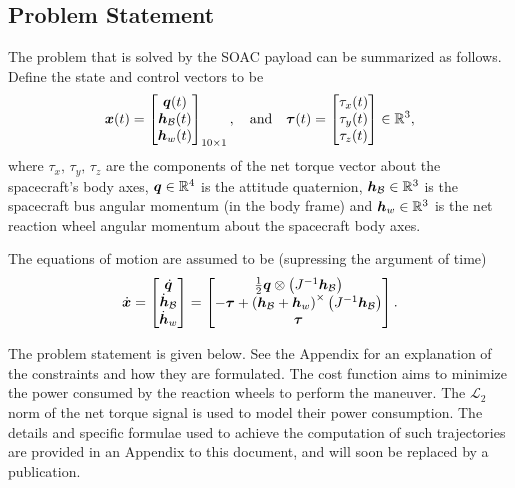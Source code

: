 \documentclass[10pt]{article}
\begin{document}
\subsection{Problem Statement}

The problem that is solved by the SOAC payload can be summarized as follows. Define the state and control vectors to be
\begin{equation}
\bm{x}(t) = \begin{bmatrix}
\bm{q}(t) \\ \bm{h}_{\mathcal{B}}(t) \\ \bm{h}_w(t)
\end{bmatrix}_{10\times 1}, \quad \text{and} \quad \bm{\tau}(t) = \begin{bmatrix}
\tau_x(t) \\ \tau_y(t) \\ \tau_z(t)
\end{bmatrix} \in {\mathbb{R}}^3,
\label{eq:state_control}
\end{equation}
where $\tau_x,\,\tau_y,\,\tau_z$ are the components of the net torque vector about the spacecraft's body axes, $\bm{q}\in{\mathbb{R}}^4$ is the attitude quaternion, $\bm{h}_{\mathcal{B}}\in{\mathbb{R}}^3$ is the spacecraft bus angular momentum (in the body frame) and $\bm{h}_w\in{\mathbb{R}}^3$ is the net reaction wheel angular momentum about the spacecraft body axes. 

The equations of motion are assumed to be (supressing the argument of time)
\begin{equation}
\dot{\bm{x}} = \begin{bmatrix}
\dot{\bm{q}} \\ \dot{\bm{h}}_{\mathcal{B}} \\ \dot{\bm{h}}_w
\end{bmatrix} = \begin{bmatrix}
\tfrac{1}{2} \bm{q} \otimes \left(J^{-1} \bm{h}_{\mathcal{B}} \right) \\
-\bm{\tau} + \left( \bm{h}_{\mathcal{B}} + \bm{h}_w \right)^{\times} \left( J^{-1} \bm{h}_{\mathcal{B}} \right) \\
\bm{\tau}
\end{bmatrix}.
\label{eq:eqms}
\end{equation}

The problem statement is given below. See the Appendix for an explanation of the constraints and how they are formulated. The cost function aims to minimize the power consumed by the reaction wheels to perform the maneuver. The $\mathcal{L}_2$ norm of the net torque signal is used to model their power consumption. The details and specific formulae used to achieve the computation of such trajectories are provided in an Appendix to this document, and will soon be replaced by a publication.
\end{document}
